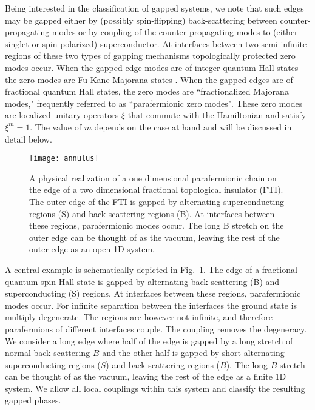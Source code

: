 \documentclass[twocolumn,aps,prb,showpacs]{revtex4-1}
\begin{document}
Being interested in the classification of gapped systems, we note that such edges may be gapped either by (possibly spin-flipping) back-scattering between counter-propagating modes or by coupling of the counter-propagating modes to (either singlet or spin-polarized) superconductor. At interfaces between two semi-infinite regions of these two types of gapping mechanisms topologically protected zero modes occur. When the gapped edge modes are of integer quantum Hall states the zero modes are Fu-Kane Majorana states \cite{Fu2008}. When the gapped edges are of fractional quantum Hall states, the zero modes are ``fractionalized Majorana modes," \cite{Linder2012,Clarke2013,Cheng2012,Barkeshli2013} frequently referred to as ``parafermionic zero modes". These zero modes are localized unitary operators $\xi$ that commute with the Hamiltonian and satisfy $\xi^m=1$. The value of $m$ depends on the case at hand and will be discussed in detail below.

\begin{figure}[t]
\texttt{[image: annulus]}
\caption{A physical realization of a one dimensional parafermionic chain on the edge of a  two dimensional fractional topological insulator (FTI). The  outer edge of  the FTI is gapped by   alternating  superconducting regions (S) and back-scattering regions (B). At interfaces between these regions, parafermionic modes occur. The long B stretch on the outer edge can be thought of as the vacuum, leaving  the rest of the outer edge as  an open  1D system. }
\label{system}
\end{figure}
A central example is schematically depicted in Fig.~\ref{system}. The edge of a fractional quantum spin Hall state is gapped by alternating back-scattering (B) and superconducting (S)  regions. At interfaces between these regions, parafermionic modes occur. For infinite separation between the interfaces the ground state is multiply degenerate. The regions are however not infinite, and therefore parafermions of different interfaces couple. The coupling removes the degeneracy.
We consider a long edge where half of the edge is gapped by a long stretch of normal back-scattering $B$ and the other half is gapped by short alternating  superconducting regions ($S$) and back-scattering regions ($B$). The long $B$ stretch can be thought of as the vacuum, leaving the rest of the edge as a finite 1D system. We allow all local couplings within this system and classify the resulting gapped phases.
\end{document}
